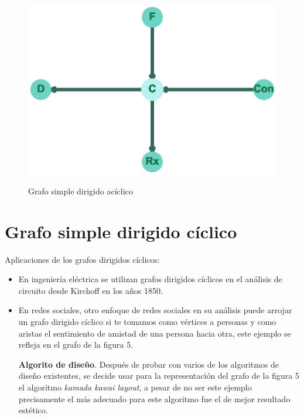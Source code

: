 \documentclass{article}
\begin{document}
\begin{figure}[h]
\begin{center}
\includegraphics[scale=0.7]{Graf4_shell_layout.eps}\\
\caption{Grafo simple dirigido acíclico}
\end{center}
\end{figure}
\newpage

\section{Grafo simple dirigido cíclico}
Aplicaciones de los grafos dirigidos cíclicos:
\begin{itemize}
\item En ingeniería eléctrica se utilizan grafos dirigidos cíclicos en el análisis de circuito desde Kirchoff en los años 1850.
\item En redes sociales, otro enfoque de redes sociales en su análisis puede arrojar un grafo dirigido cíclico si te tomamos como vértices a personas y como aristas el sentimiento de amistad de una persona hacia otra, este ejemplo se refleja en el grafo de la figura 5.\linebreak

\textbf{Algorito de diseño}.\linebreak
Después de probar con varios de los algoritmos de diseño existentes, se decide usar para la representación del grafo de la figura 5 el algoritmo \textit{kamada kawai layout}, a pesar de no ser este ejemplo precisamente el más adecuado para este algoritmo fue el de mejor resultado estético.


\end{itemize}
\begin{center}

\end{center}
\end{document}
